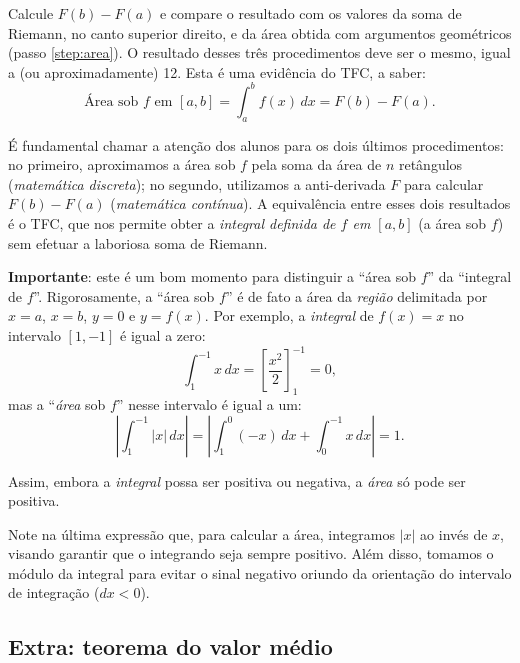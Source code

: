 \documentclass[a4paper,12pt]{scrartcl}
\newcommand\importante{\textbf{Importante}}
\begin{document}
\begin{list}{.}
      \item Calcule $F(b) - F(a)$ e compare o resultado com os valores da soma de Riemann, no canto superior direito, e da área obtida com argumentos geométricos (passo \ref{step:area}). O resultado desses três procedimentos deve ser o mesmo, igual a (ou aproximadamente) 12. Esta é uma evidência do TFC, a saber:
      \begin{equation}\label{eq:TFC}
       \text{Área sob $f$ em $[a,b]$} = \int_a^b f(x)\,dx = F(b) - F(a).
      \end{equation}
      
      É fundamental chamar a atenção dos alunos para os dois últimos procedimentos: no primeiro, aproximamos a área sob $f$ pela soma da área de $n$ retângulos (\emph{matemática discreta}); no segundo, utilizamos a anti-derivada $F$ para calcular $F(b) - F(a)$ (\emph{matemática contínua}). A equivalência entre esses dois resultados é o TFC, que nos permite obter a \emph{integral definida de $f$ em $[a,b]$} (a área sob $f$) sem efetuar a laboriosa soma de Riemann.
      
      \importante: este é um bom momento para distinguir a ``área sob $f$'' da ``integral de $f$''.
      Rigorosamente, a ``área sob $f$'' é de fato a área da \emph{região} delimitada por $x = a$, $x = b$, $y = 0$ e $y = f(x)$.
      Por exemplo, a \emph{integral} de $f(x) = x$ no intervalo $[1,-1]$ é igual a zero:
      \begin{equation*}
	\int_{1}^{-1} x\, dx = \left[\frac{x^2}{2}\right]_{1}^{-1} = 0,
      \end{equation*}
      mas a ``\emph{área} sob $f$'' nesse intervalo é igual a um:
      \begin{equation*}
	\left|\int_{1}^{-1}|x|\,dx\right| = \left|\int_{1}^{0}(-x)\, dx + \int_{0}^{-1}x\, dx\right| = 1.
      \end{equation*}
      
      Assim, embora a \emph{integral} possa ser positiva ou negativa, a \emph{área} só pode ser positiva.
      
      Note na última expressão que, para calcular a área, integramos $|x|$ ao invés de $x$, visando garantir que o integrando seja sempre positivo.
      Além disso, tomamos o módulo da integral para evitar o sinal negativo oriundo da orientação do intervalo de integração ($dx < 0$).
      
    \end{list}
    
    \subsection*{Extra: teorema do valor médio}
    
\end{document}
